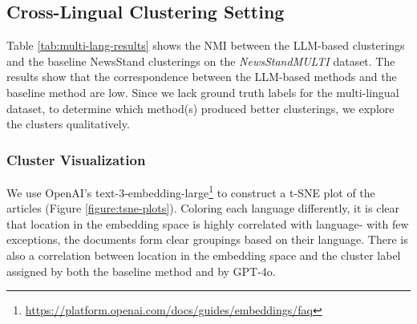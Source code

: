 

\subsection{Cross-Lingual Clustering Setting}

Table \ref{tab:multi-lang-results} shows the NMI between the LLM-based clusterings and the baseline NewsStand clusterings on the \emph{NewsStandMULTI} dataset.
The results show that the correspondence between the LLM-based methods and the baseline method are low.
Since we lack ground truth labels for the multi-lingual dataset, to determine which method(s) produced better clusterings, we explore the clusters qualitatively.

\subsubsection{Cluster Visualization}

We use OpenAI's text-3-embedding-large\footnote{\url{https://platform.openai.com/docs/guides/embeddings/faq}} to construct a t-SNE plot of the articles (Figure \ref{figure:tsne-plots}).
Coloring each language differently, it is clear that location in the embedding space is highly correlated with language- with few exceptions, the documents form clear groupings based on their language.
There is also a correlation between location in the embedding space and the cluster label assigned by both the baseline method and by GPT-4o. 


